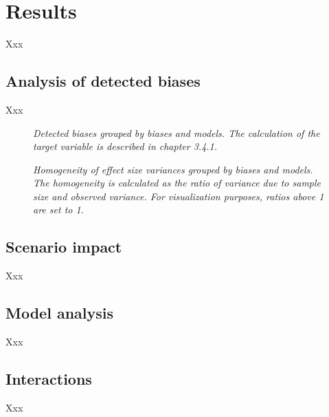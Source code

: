 \section{Results}
Xxx

\subsection{Analysis of detected biases}
Xxx

\begin{figure}[htbp]
    \centering
    
    \caption[Scenario overview]{\centering \textit{Detected biases grouped by biases and models. The calculation of the target variable is described in chapter 3.4.1.}}
    \label{fig:detections-heatmap}
\end{figure}

\begin{figure}[htbp]
    \centering
    
    \caption[Scenario overview]{\centering \textit{Homogeneity of effect size variances grouped by biases and models. The homogeneity is calculated as the ratio of variance due to sample size and observed variance. For visualization purposes, ratios above 1 are set to 1.}}
    \label{fig:homogeneity-heatmap}
\end{figure}

\subsection{Scenario impact}
Xxx

\subsection{Model analysis}
Xxx

\subsection{Interactions}
Xxx
